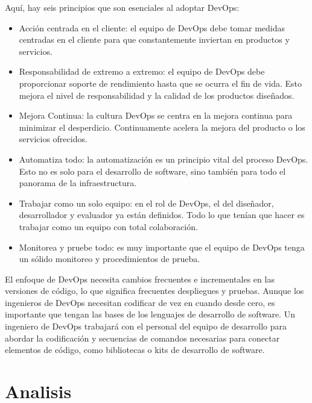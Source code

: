 \documentclass[preprint,12pt]{elsarticle}
\begin{document}
Aquí, hay seis principios que son esenciales al adoptar DevOps:

\begin{itemize}

\item Acción centrada en el cliente: el equipo de DevOps debe tomar medidas centradas en el cliente para que constantemente inviertan en productos y servicios.
\item Responsabilidad de extremo a extremo: el equipo de DevOps debe proporcionar soporte de rendimiento hasta que se ocurra el fin de vida. Esto mejora el nivel de responsabilidad y la calidad de los productos diseñados.
\item Mejora Continua: la cultura DevOps se centra en la mejora continua para minimizar el desperdicio. Continuamente acelera la mejora del producto o los servicios ofrecidos.
\item Automatiza todo: la automatización es un principio vital del proceso DevOps. Esto no es solo para el desarrollo de software, sino también para todo el panorama de la infraestructura.
\item Trabajar como un solo equipo: en el rol de DevOps, el del diseñador, desarrollador y evaluador ya están definidos. Todo lo que tenían que hacer es trabajar como un equipo con total colaboración.
\item Monitorea y pruebe todo: es muy importante que el equipo de DevOps tenga un sólido monitoreo y procedimientos de prueba.

\end{itemize}

El enfoque de DevOps necesita cambios frecuentes e incrementales en las versiones de código, lo que significa frecuentes despliegues y pruebas.
Aunque los ingenieros de DevOps necesitan codificar de vez en cuando desde cero, es importante que tengan las bases de los lenguajes de desarrollo de software.
Un ingeniero de DevOps trabajará con el personal del equipo de desarrollo para abordar la codificación y secuencias de comandos necesarias para conectar elementos de código, como bibliotecas o kits de desarrollo de software.






\section{Analisis}
\end{document}
